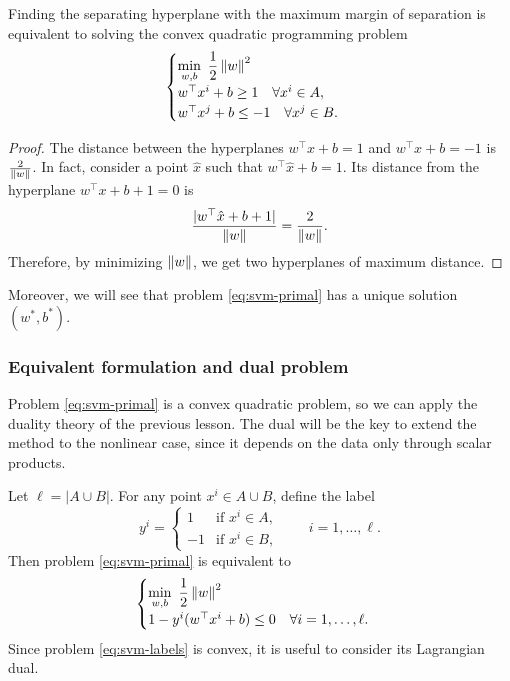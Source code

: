 \begin{theorem}
    \label{thm:svm-primal}
    Finding the separating hyperplane with the maximum margin of separation is equivalent to solving the convex quadratic programming problem
    \begin{equation}
        \begin{cases}
            \displaystyle \min_{w, b} \ \frac{1}{2} \left\lVert w \right\rVert^2 \\
            w^\top x^i + b \ge 1 \quad \forall x^i \in A, \\
            w^\top x^j + b \le -1 \quad \forall x^j \in B.
        \end{cases}
        \label{eq:svm-primal}
    \end{equation}
\end{theorem}

\begin{proof}
    The distance between the hyperplanes $w^\top x + b = 1$ and $w^\top x + b = -1$ is $\frac{2}{\left\lVert w \right\rVert}$. In fact, consider a point $\hat{x}$ such that $w^\top \hat{x} + b = 1$. Its distance from the hyperplane $w^\top x + b + 1 = 0$ is
    \[
        \frac{|w^\top \hat{x} + b + 1|}{\left\lVert w \right\rVert} = \frac{2}{\left\lVert w \right\rVert}.
    \]
    Therefore, by minimizing $\left\lVert w \right\rVert$, we get two hyperplanes of maximum distance.
\end{proof}

Moreover, we will see that problem \cref{eq:svm-primal} has a unique solution $(w^*, b^*)$.

\subsubsection{Equivalent formulation and dual problem}

Problem \cref{eq:svm-primal} is a convex quadratic problem, so we can apply the duality theory of the previous lesson. The dual will be the key to extend the method to the nonlinear case, since it depends on the data only through scalar products.

Let $\ell = |A \cup B|$. For any point $x^i \in A \cup B$, define the label
\[
    y^i =
    \begin{cases}
        1 & \text{if } x^i \in A, \\
        -1 & \text{if } x^i \in B,
    \end{cases}
    \qquad i = 1, \dots, \ell.
\]
Then problem \cref{eq:svm-primal} is equivalent to
\begin{equation}
    \begin{cases}
        \displaystyle \min_{w, b} \ \frac{1}{2} \left\lVert w \right\rVert^2 \\
        1 - y^i (w^\top x^i + b) \le 0 \quad \forall i = 1, \dots, \ell.
    \end{cases}
    \label{eq:svm-labels}
\end{equation}
Since problem \cref{eq:svm-labels} is convex, it is useful to consider its Lagrangian dual.

